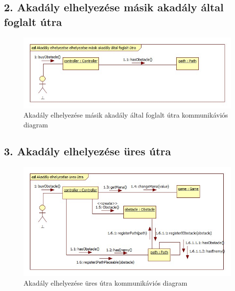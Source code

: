 \subsection{2. Akadály elhelyezése másik akadály által foglalt útra}
\begin{figure}[H]
\begin{center}
\includegraphics[width=17cm]{chapters/chapter05/images/cd_Akadaly_elhelyezese_masik_akadaly_altal_foglalt_utra.jpg}
\caption{Akadály elhelyezése másik akadály által foglalt útra kommunikáviós diagram}
\label{fig:cd_Akadaly_elhelyezese_masik_akadaly_altal_foglalt_utra}
\end{center}
\end{figure}

\subsection{3. Akadály elhelyezése üres útra}
\begin{figure}[H]
\begin{center}
\includegraphics[width=17cm]{chapters/chapter05/images/cd_Akadaly_elhelyezese_ures_utra.jpg}
\caption{Akadály elhelyezése üres útra kommunikáviós diagram}
\label{fig:cd_Akadaly_elhelyezese_ures_utra}
\end{center}
\end{figure}

